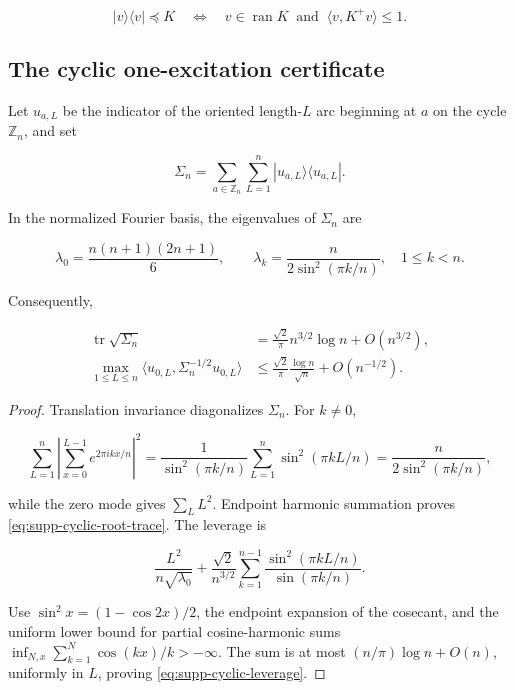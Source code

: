 \begin{equation}\label{eq:supp-rank-one-criterion}
 |v\rangle\langle v|\preceq K
 \quad\Longleftrightarrow\quad
 v\in\operatorname{ran}K\ \text{ and }\
 \langle v,K^+v\rangle\le1.
\end{equation}

\subsection{The cyclic one-excitation certificate}

Let \(u_{a,L}\) be the indicator of the oriented length-\(L\) arc beginning
at \(a\) on the cycle \(\mathbb Z_n\), and set

\begin{equation}\label{eq:supp-cyclic-frame}
 \Sigma_n=\sum_{a\in\mathbb Z_n}\sum_{L=1}^n
 |u_{a,L}\rangle\langle u_{a,L}|.
\end{equation}

\begin{lemma}
\label{lem:supp-cyclic-spectrum}
In the normalized Fourier basis, the eigenvalues of \(\Sigma_n\) are

\begin{equation}\label{eq:supp-cyclic-eigenvalues}
 \lambda_0=\frac{n(n+1)(2n+1)}6,
 \qquad
 \lambda_k=\frac{n}{2\sin^2(\pi k/n)},\quad1\le k<n.
\end{equation}

Consequently,

\begin{align}
 \operatorname{tr}\sqrt{\Sigma_n}
 &=\frac{\sqrt2}{\pi}n^{3/2}\log n+O(n^{3/2}),
 \label{eq:supp-cyclic-root-trace}\\
 \max_{1\le L\le n}
 \langle u_{0,L},\Sigma_n^{-1/2}u_{0,L}\rangle
 &\le\frac{\sqrt2}{\pi}\frac{\log n}{\sqrt n}
 +O(n^{-1/2}).
 \label{eq:supp-cyclic-leverage}
\end{align}
\end{lemma}

\begin{proof}
Translation invariance diagonalizes \(\Sigma_n\).  For \(k\ne0\),

\[
 \sum_{L=1}^n\left|\sum_{x=0}^{L-1}e^{2\pi ikx/n}\right|^2
 =\frac1{\sin^2(\pi k/n)}
 \sum_{L=1}^n\sin^2(\pi kL/n)
 =\frac{n}{2\sin^2(\pi k/n)},
\]

while the zero mode gives \(\sum_LL^2\).  Endpoint harmonic summation proves
\eqref{eq:supp-cyclic-root-trace}.  The leverage is

\[
 \frac{L^2}{n\sqrt{\lambda_0}}
 +\frac{\sqrt2}{n^{3/2}}
 \sum_{k=1}^{n-1}
 \frac{\sin^2(\pi kL/n)}{\sin(\pi k/n)}.
\]

Use \(\sin^2x=(1-\cos2x)/2\), the endpoint expansion of the cosecant, and
the uniform lower bound for partial cosine-harmonic sums
\(\inf_{N,x}\sum_{k=1}^N\cos(kx)/k> -\infty\).  The sum is at most
\((n/\pi)\log n+O(n)\), uniformly in \(L\), proving
\eqref{eq:supp-cyclic-leverage}.
\end{proof}

